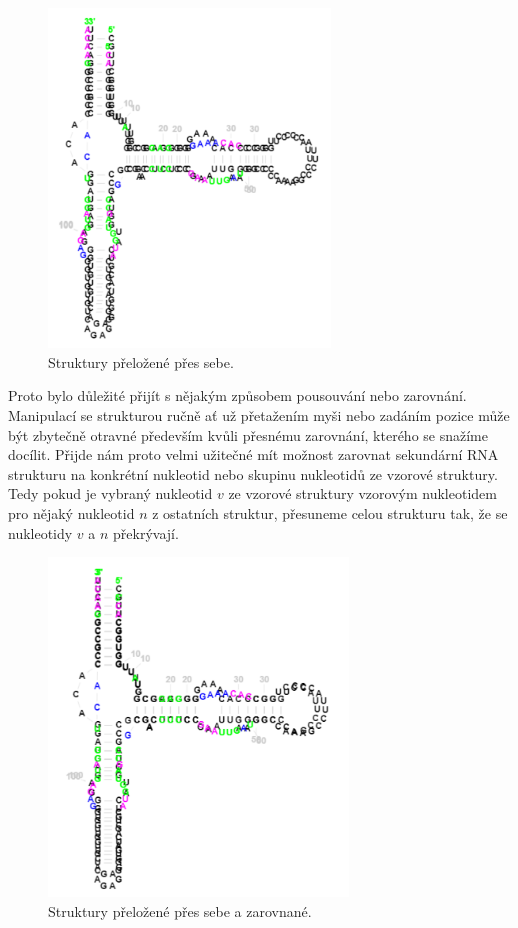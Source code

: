 \begin{figure}[H]
  \centering
  \includegraphics[height=90mm]{../img/kap02/align/unaligned.png}
  \caption{Struktury přeložené přes sebe.}
\end{figure}

Proto bylo důležité přijít s nějakým způsobem pousouvání nebo zarovnání.
Manipulací se strukturou ručně ať už přetažením myši nebo zadáním pozice může
být zbytečně otravné především kvůli přesnému zarovnání, kterého se snažíme
docílit. Přijde nám proto velmi užitečné mít možnost zarovnat sekundární RNA
strukturu na konkrétní nukleotid nebo skupinu nukleotidů ze vzorové struktury.
Tedy pokud je vybraný nukleotid $v$ ze vzorové struktury vzorovým nukleotidem
pro nějaký nukleotid $n$ z ostatních struktur, přesuneme celou strukturu tak,
že se nukleotidy $v$ a $n$ překrývají. 

\begin{figure}[H]
  \centering
  \includegraphics[height=90mm]{../img/kap02/align/alignedAlpha1.png}
  \caption{Struktury přeložené přes sebe a zarovnané.}
\end{figure}

